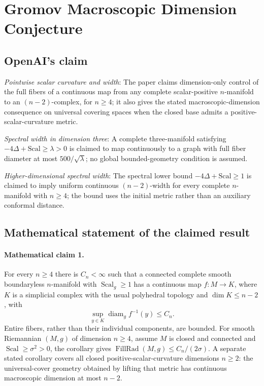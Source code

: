 \documentclass[11pt]{article}
\begin{document}
\section*{Gromov Macroscopic Dimension Conjecture}

\subsection{OpenAI's claim}
\textit{Pointwise scalar curvature and width}: The paper claims dimension-only control of the full fibers of a continuous map from any complete scalar-positive $n$-manifold to an $(n-2)$-complex, for $n\ge4$; it also gives the stated macroscopic-dimension consequence on universal covering spaces when the closed base admits a positive-scalar-curvature metric.

\textit{Spectral width in dimension three}: A complete three-manifold satisfying $-4\Delta+\mathrm{Scal}\ge\lambda>0$ is claimed to map continuously to a graph with full fiber diameter at most $500/\sqrt\lambda$; no global bounded-geometry condition is assumed.

\textit{Higher-dimensional spectral width}: The spectral lower bound $-4\Delta+\mathrm{Scal}\ge1$ is claimed to imply uniform continuous $(n-2)$-width for every complete $n$-manifold with $n\ge4$; the bound uses the initial metric rather than an auxiliary conformal distance.

\subsection{Mathematical statement of the claimed result}
\paragraph{Mathematical claim 1.} For every $n\ge4$ there is $C_n<\infty$ such that a connected complete smooth boundaryless $n$-manifold with $\operatorname{Scal}_g\ge1$ has a continuous map $f:M\to K$, where $K$ is a simplicial complex with the usual polyhedral topology and $\dim K\le n-2$, with \[\sup_{y\in K}\operatorname{diam}_g f^{-1}(y)\le C_n.\] Entire fibers, rather than their individual components, are bounded. For smooth Riemannian $(M,g)$ of dimension $n\ge4$, assume $M$ is closed and connected and $\operatorname{Scal}\ge\sigma^2>0$, the corollary gives $\operatorname{FillRad}(M,g)\le C_n/(2\sigma)$. A separate stated corollary covers all closed positive-scalar-curvature dimensions $n\ge2$: the universal-cover geometry obtained by lifting that metric has continuous macroscopic dimension at most $n-2$.
\end{document}
